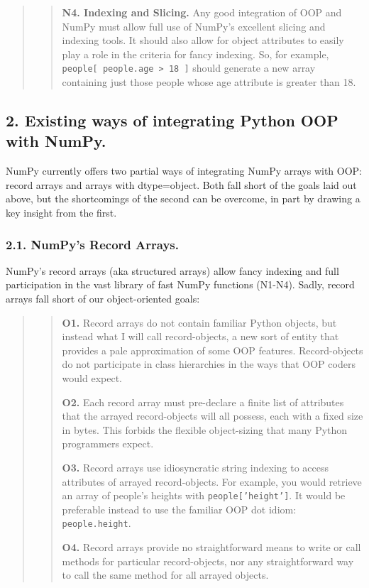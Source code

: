 \documentclass[letterpaper,compsoc,twoside]{IEEEtran}
\begin{document}
\begin{quotation}
\begin{quote}
\textbf{N4.  Indexing and Slicing.}  Any good integration of OOP and NumPy must allow full use of NumPy's excellent slicing and indexing tools.  It should also allow for object attributes to easily play a role in the criteria for \textquotedbl{}fancy indexing\textquotedbl{}.  So, for example, \texttt{people{[} people.age > 18 {]}} should generate a new array containing just those people whose age attribute is greater than 18.
\end{quote}
\end{quotation}

\subsection{2.  Existing ways of integrating Python OOP with NumPy.%
  \label{existing-ways-of-integrating-python-oop-with-numpy}%
}


NumPy currently offers two partial ways of integrating NumPy arrays with OOP: record arrays and arrays with dtype=object.  Both fall short of the goals laid out above, but the shortcomings of the second can be overcome, in part by drawing a key insight from the first.

\subsubsection{2.1.  NumPy's Record Arrays.%
  \label{numpy-s-record-arrays}%
}


NumPy's record arrays (aka \textquotedbl{}structured arrays\textquotedbl{}) allow fancy indexing and full participation in the vast library of fast NumPy functions (N1-N4).  Sadly, record arrays fall short of our object-oriented goals:\begin{quotation}%
\begin{quote}


\textbf{O1.}  Record arrays do not contain familiar Python objects, but instead what I will call \textquotedbl{}record-objects\textquotedbl{}, a new sort of entity that provides a pale approximation of some OOP features.  Record-objects do not participate in class hierarchies in the ways that OOP coders would expect.

\textbf{O2.}  Each record array must pre-declare a finite list of attributes that the arrayed record-objects will all possess, each with a fixed size in bytes.  This forbids the flexible object-sizing that many Python programmers expect.

\textbf{O3.}  Record arrays use idiosyncratic string indexing to access attributes of arrayed record-objects.  For example, you would retrieve an array of people's heights with \texttt{people{[}'height'{]}}.  It would be preferable instead to use the familiar OOP dot idiom: \texttt{people.height}.

\textbf{O4.}  Record arrays provide no straightforward means to write or call methods for particular record-objects, nor any straightforward way to call the same method for all arrayed objects.
\end{quote}
\end{quotation}
\end{document}
